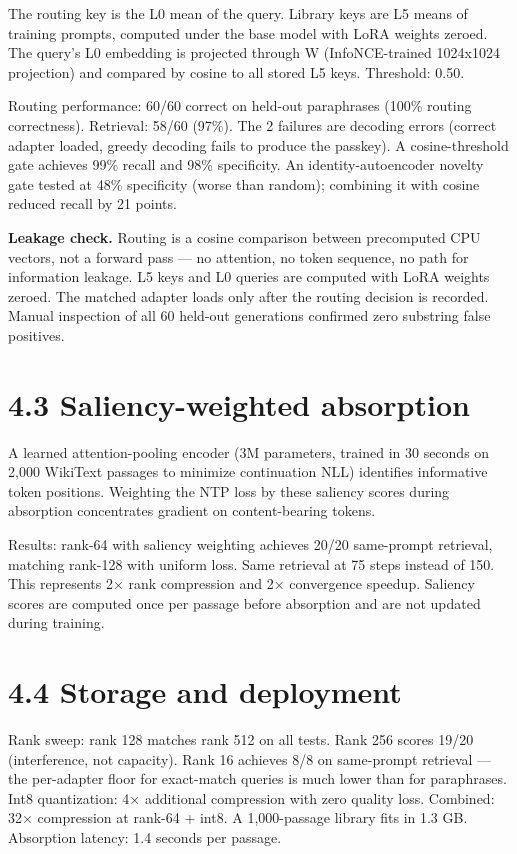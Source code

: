 The routing key is the L0 mean of the query. Library keys are L5 means of training prompts, computed under the base model with LoRA weights zeroed. The query's L0 embedding is projected through W (InfoNCE-trained 1024x1024 projection) and compared by cosine to all stored L5 keys. Threshold: 0.50.

Routing performance: 60/60 correct on held-out paraphrases (100\% routing correctness). Retrieval: 58/60 (97\%). The 2 failures are decoding errors (correct adapter loaded, greedy decoding fails to produce the passkey). A cosine-threshold gate achieves 99\% recall and 98\% specificity. An identity-autoencoder novelty gate tested at 48\% specificity (worse than random); combining it with cosine reduced recall by 21 points.

\textbf{Leakage check.} Routing is a cosine comparison between precomputed CPU vectors, not a forward pass --- no attention, no token sequence, no path for information leakage. L5 keys and L0 queries are computed with LoRA weights zeroed. The matched adapter loads only after the routing decision is recorded. Manual inspection of all 60 held-out generations confirmed zero substring false positives.

\section{4.3 Saliency-weighted absorption}\label{saliency-weighted-absorption}

A learned attention-pooling encoder (3M parameters, trained in 30 seconds on 2,000 WikiText passages to minimize continuation NLL) identifies informative token positions. Weighting the NTP loss by these saliency scores during absorption concentrates gradient on content-bearing tokens.

Results: rank-64 with saliency weighting achieves 20/20 same-prompt retrieval, matching rank-128 with uniform loss. Same retrieval at 75 steps instead of 150. This represents 2× rank compression and 2× convergence speedup. Saliency scores are computed once per passage before absorption and are not updated during training.

\section{4.4 Storage and deployment}\label{storage-and-deployment}

Rank sweep: rank 128 matches rank 512 on all tests. Rank 256 scores 19/20 (interference, not capacity). Rank 16 achieves 8/8 on same-prompt retrieval --- the per-adapter floor for exact-match queries is much lower than for paraphrases. Int8 quantization: 4× additional compression with zero quality loss. Combined: 32× compression at rank-64 + int8. A 1,000-passage library fits in 1.3 GB. Absorption latency: 1.4 seconds per passage.

